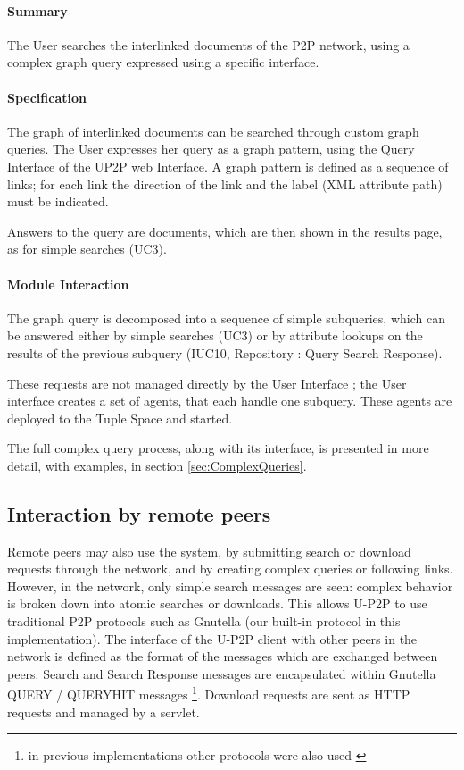 \documentclass[titlepage]{article}%
\begin{document}
\paragraph{Summary}
The User searches the interlinked documents of the P2P network, using a complex graph query expressed using a specific interface.

\paragraph{Specification}
The graph of interlinked documents can be searched through custom graph queries. The User expresses her query as a graph pattern, using the Query Interface of the UP2P web Interface. A graph pattern is defined as a sequence of links; for each link the direction of the link and the label (XML attribute path) must be indicated. 

Answers to the query are documents, which are then shown in the results page, as for simple searches (UC3).

\paragraph{Module Interaction}

The graph query is decomposed into a sequence of simple subqueries, which can be answered either by simple searches (UC3) or by attribute lookups on the results of the previous subquery (IUC10, Repository : Query Search Response).

These requests are not managed directly by the User Interface ; the User interface creates a set of agents, that each handle one subquery. These agents are deployed to the Tuple Space and started.

The full complex query process, along with its interface, is presented in more detail, with examples, in section \ref{sec:ComplexQueries}.

\subsection{Interaction by remote peers}
\label{uclist2}
Remote peers may also use the system, by submitting search or download requests through the network, and by creating complex queries or following links. 
However, in the network, only simple search messages are seen: complex behavior is broken down into atomic searches or downloads. This allows U-P2P to use traditional P2P protocols such as Gnutella (our built-in protocol in this implementation).
The interface of the U-P2P client with other peers in the network is defined as the format of the messages which are exchanged between peers.
Search and Search Response messages are encapsulated within Gnutella QUERY / QUERYHIT messages \footnote{in previous implementations other protocols were also used \cite{UP2P2002, UP2P2003, UP2P2006}}. Download requests are sent as HTTP requests and managed by a servlet.
\end{document}
